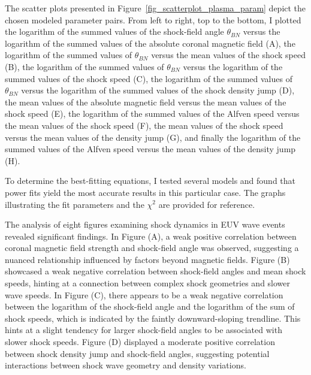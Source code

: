 The scatter plots presented in Figure~\ref{fig_scatterplot_plasma_param} depict the chosen modeled parameter pairs. From left to right, top to the bottom, I plotted the logarithm of the summed values of the shock-field angle $\theta_{BN}$ versus the logarithm of the summed values of the absolute coronal magnetic field (A), the logarithm of the summed values of $\theta_{BN}$ versus the mean values of the shock speed (B), the logarithm of the summed values of $\theta_{BN}$ versus the logarithm of the summed values of the shock speed (C), the logarithm of the summed values of $\theta_{BN}$ versus the logarithm of the summed values of the shock density jump (D), the mean values of the absolute magnetic field versus the mean values of the shock speed (E), the logarithm of the summed values of the Alfven speed versus the mean values of the shock speed (F), the mean values of the shock speed versus the mean values of the density jump (G), and finally the logarithm of the summed values of the Alfven speed versus the mean values of the density jump (H).

To determine the best-fitting equations, I tested several models and found that power fits yield the most accurate results in this particular case. The graphs illustrating the fit parameters and the $\chi^2$ are provided for reference.


The analysis of eight figures examining shock dynamics in EUV wave events revealed significant findings. In Figure (A), a weak positive correlation between coronal magnetic field strength and shock-field angle was observed, suggesting a nuanced relationship influenced by factors beyond magnetic fields. Figure (B) showcased a weak negative correlation between shock-field angles and mean shock speeds, hinting at a connection between complex shock geometries and slower wave speeds. In Figure (C), there appears to be a weak negative correlation between the logarithm of the shock-field angle and the logarithm of the sum of shock speeds, which is indicated by the faintly downward-sloping trendline. This hints at a slight tendency for larger shock-field angles to be associated with slower shock speeds. Figure (D) displayed a moderate positive correlation between shock density jump and shock-field angles, suggesting potential interactions between shock wave geometry and density variations.

